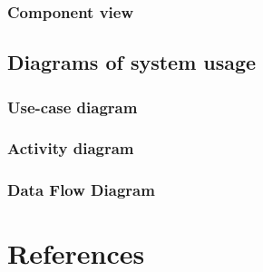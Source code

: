 \documentclass[12pt]{article}
\begin{document}
\subsubsection{Component view}

\subsection{Diagrams of system usage}
\subsubsection{Use-case diagram}
\subsubsection{Activity diagram}
\subsubsection{Data Flow Diagram}

\newpage
\section{References}
\end{document}
